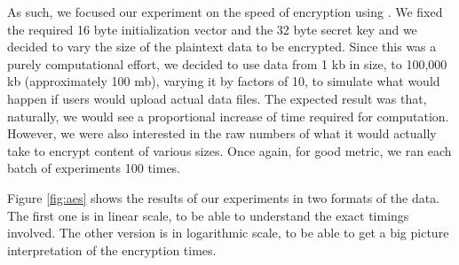 As such, we focused our experiment on the speed of encryption using .
We fixed the required 16 byte initialization vector and the 32 byte secret key and we decided to vary the size of the plaintext data to be encrypted.
Since this was a purely computational effort, we decided to use data from 1 kb in size, to 100,000 kb (approximately 100 mb), varying it by factors of 10, to simulate what would happen if users would upload actual data files.
The expected result was that, naturally, we would see a proportional increase of time required for computation.
However, we were also interested in the raw numbers of what it would actually take to encrypt content of various sizes.
Once again, for good metric, we ran each batch of experiments 100 times.

Figure \ref{fig:aes} shows the results of our experiments in two formats of the data.
The first one is in linear scale, to be able to understand the exact timings involved.
The other version is in logarithmic scale, to be able to get a big picture interpretation of the encryption times.

